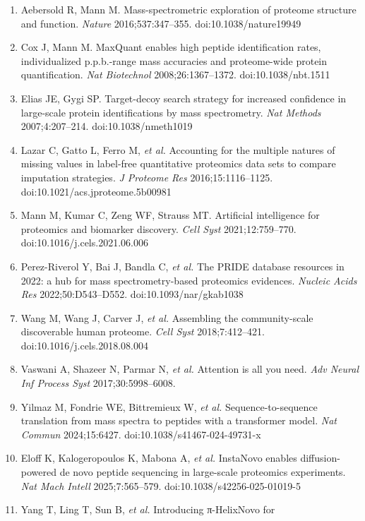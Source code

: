 \documentclass[
]{article}
\providecommand{\tightlist}{%
  \setlength{\itemsep}{0pt}\setlength{\parskip}{0pt}}
\begin{document}
\begin{enumerate}
\def\labelenumi{\arabic{enumi}.}
\tightlist
\item
  Aebersold R, Mann M. Mass-spectrometric exploration of proteome
  structure and function. \emph{Nature} 2016;537:347--355.
  doi:10.1038/nature19949
\item
  Cox J, Mann M. MaxQuant enables high peptide identification rates,
  individualized p.p.b.-range mass accuracies and proteome-wide protein
  quantification. \emph{Nat Biotechnol} 2008;26:1367--1372.
  doi:10.1038/nbt.1511
\item
  Elias JE, Gygi SP. Target-decoy search strategy for increased
  confidence in large-scale protein identifications by mass
  spectrometry. \emph{Nat Methods} 2007;4:207--214.
  doi:10.1038/nmeth1019
\item
  Lazar C, Gatto L, Ferro M, \emph{et al.} Accounting for the multiple
  natures of missing values in label-free quantitative proteomics data
  sets to compare imputation strategies. \emph{J Proteome Res}
  2016;15:1116--1125. doi:10.1021/acs.jproteome.5b00981
\item
  Mann M, Kumar C, Zeng WF, Strauss MT. Artificial intelligence for
  proteomics and biomarker discovery. \emph{Cell Syst} 2021;12:759--770.
  doi:10.1016/j.cels.2021.06.006
\item
  Perez-Riverol Y, Bai J, Bandla C, \emph{et al.} The PRIDE database
  resources in 2022: a hub for mass spectrometry-based proteomics
  evidences. \emph{Nucleic Acids Res} 2022;50:D543--D552.
  doi:10.1093/nar/gkab1038
\item
  Wang M, Wang J, Carver J, \emph{et al.} Assembling the community-scale
  discoverable human proteome. \emph{Cell Syst} 2018;7:412--421.
  doi:10.1016/j.cels.2018.08.004
\item
  Vaswani A, Shazeer N, Parmar N, \emph{et al.} Attention is all you
  need. \emph{Adv Neural Inf Process Syst} 2017;30:5998--6008.
\item
  Yilmaz M, Fondrie WE, Bittremieux W, \emph{et al.}
  Sequence-to-sequence translation from mass spectra to peptides with a
  transformer model. \emph{Nat Commun} 2024;15:6427.
  doi:10.1038/s41467-024-49731-x
\item
  Eloff K, Kalogeropoulos K, Mabona A, \emph{et al.} InstaNovo enables
  diffusion-powered de novo peptide sequencing in large-scale proteomics
  experiments. \emph{Nat Mach Intell} 2025;7:565--579.
  doi:10.1038/s42256-025-01019-5
\item
  Yang T, Ling T, Sun B, \emph{et al.} Introducing π-HelixNovo for

\end{enumerate}
\end{document}
